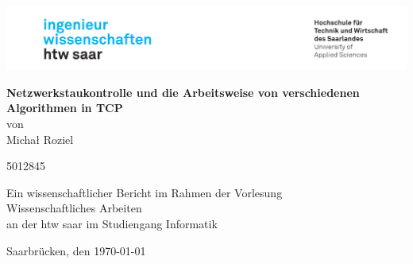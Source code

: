 \begin{titlepage}

\linespread{1.5}

\includegraphics[width=\linewidth]{graphics/htw_logo}

\begin{center}
    \large  
    \hfill
    \vfill
    \Large{\bfseries{Netzwerkstaukontrolle und die Arbeitsweise von verschiedenen Algorithmen in TCP}}\\
    
    von \\
    Michał Roziel

    5012845

    \vfill
		
    Ein wissenschaftlicher Bericht im Rahmen der Vorlesung\\
    \glqq Wissenschaftliches Arbeiten\grqq\\
    an der htw saar im Studiengang Informatik\\
	
    \vfill	
    \vfill
	
    Saarbrücken, den \today
\end{center}
    
\end{titlepage}
